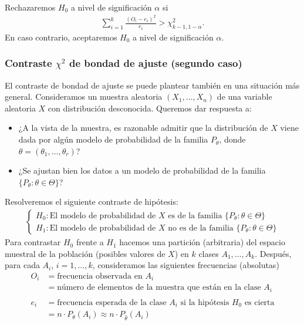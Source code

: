 \\
\newline
Rechazaremos $H_0$ a nivel de significación $\alpha$ si
\begin{align*}
    \sum_{i=1}^{k} \frac{(O_i - e_i)^2}{e_i} > \chi^2_{k-1, 1 - \alpha}.
\end{align*}
En caso contrario, aceptaremos $H_0$ a nivel de significación $\alpha$.

\subsubsection{Contraste $\chi^2$ de bondad de ajuste (segundo caso)}

\noindent El contraste de bondad de ajuste se puede plantear también en una situación más general. Consideramos un muestra aleatoria $(X_1,\ldots, X_n)$ de una variable aleatoria $X$ con distribución desconocida. Queremos dar respuesta a: 
\begin{itemize}
    \item ¿A la vista de la muestra, es razonable admitir que la distribución de $X$ viene dada por algún modelo de probabilidad de la familia $P_{\theta}$, donde $\theta = (\theta_1,\ldots,\theta_r)$?
    \item ¿Se ajustan bien los datos a un modelo de probabilidad de la familia $\{P_{\theta} : \theta \in \Theta\}$?
\end{itemize}
Resolveremos el siguiente contraste de hipótesis:
\begin{align*}
    \begin{cases}
        H_0 : \text{El modelo de probabilidad de $X$ es de la familia $\{P_{\theta} : \theta \in \Theta\}$} \\
        H_1 : \text{El modelo de probabilidad de $X$ no es de la familia $\{P_{\theta} : \theta \in \Theta\}$}
    \end{cases}
\end{align*}
Para contrastar $H_0$ frente a $H_1$ hacemos una partición (arbitraria) del espacio muestral de la población (posibles valores de $X$) en $k$ clases $A_1, \ldots, A_k$. Después, para cada $A_i$, $i=1,\ldots,k$, consideramos las siguientes frecuencias (absolutas)
\begin{align*}
    O_i &= \text{frecuencia observada en $A_i$} \\
    &= \text{número de elementos de la muestra que están en la clase $A_i$} \\ \\
    e_i &= \text{frecuencia esperada de la clase $A_i$ si la hipótesis $H_0$ es cierta} \\
    &= n \cdot P_{\theta}(A_i) \approx n \cdot P_{\widehat{\theta}}(A_i)
\end{align*}
